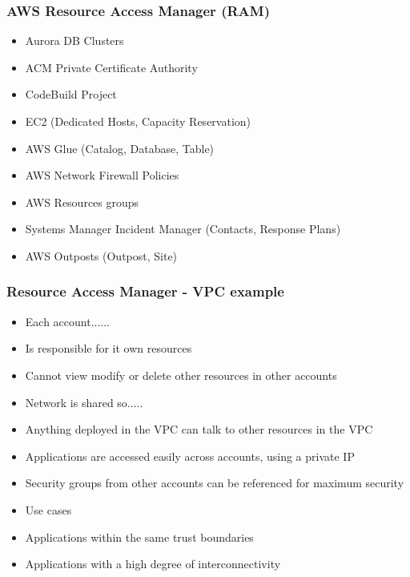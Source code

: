 \subsubsection{AWS Resource Access Manager (RAM)}
\begin{itemize}
    \item Aurora DB Clusters
    \item ACM Private Certificate Authority
    \item CodeBuild Project
    \item EC2 (Dedicated Hosts, Capacity Reservation)
    \item AWS Glue (Catalog, Database, Table)
    \item AWS Network Firewall Policies
    \item AWS Resources groups
    \item Systems Manager Incident Manager (Contacts, Response Plans)
    \item AWS Outposts (Outpost, Site)
\end{itemize}

\subsubsection{Resource Access Manager - VPC example}
\begin{itemize}
    \item Each account......
    \item Is responsible for it own resources
    \item Cannot view modify or delete other resources in other accounts
    \item Network is shared so.....
    \item Anything deployed in the VPC can talk to other resources in the VPC
    \item Applications are accessed easily across accounts, using a private IP
    \item Security groups from other accounts can be referenced for maximum security
    \item Use cases
    \item Applications within the same trust boundaries
    \item Applications with a high degree of interconnectivity
\end{itemize}

